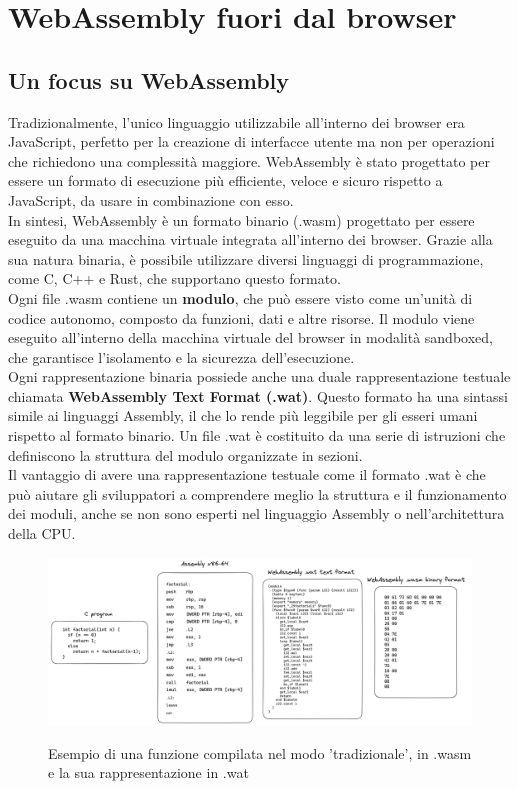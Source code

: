 \chapter{WebAssembly fuori dal browser}

\section{Un focus su WebAssembly}
\label{sec:webassembly}
Tradizionalmente, l'unico linguaggio utilizzabile all'interno dei browser era JavaScript, perfetto per la creazione di
interfacce utente ma non per operazioni che richiedono una complessità maggiore. WebAssembly è stato progettato per
essere un formato di esecuzione più efficiente, veloce e sicuro rispetto a JavaScript, da usare in combinazione con
esso\cite{webassembly-concepts}. \\
In sintesi, WebAssembly è un formato binario (.wasm) progettato per essere eseguito da una macchina virtuale integrata
all'interno dei browser. Grazie alla sua natura binaria, è possibile utilizzare diversi linguaggi di programmazione,
come C, C++ e Rust, che supportano questo formato. \\
Ogni file .wasm contiene un \textbf{modulo}, che può essere visto come un'unità di codice autonomo, composto da
funzioni, dati e altre risorse. Il modulo viene eseguito all'interno della macchina virtuale del browser in modalità
sandboxed, che garantisce l'isolamento e la sicurezza dell'esecuzione. \\
Ogni rappresentazione binaria possiede anche una duale rappresentazione testuale chiamata \textbf{WebAssembly Text
Format (.wat)}. Questo formato ha una sintassi simile ai linguaggi Assembly, il che lo rende più leggibile per gli
esseri umani rispetto al formato binario. Un file .wat è costituito da una serie di istruzioni che definiscono la
struttura del modulo organizzate in sezioni. \\
Il vantaggio di avere una rappresentazione testuale come il formato .wat è che può aiutare gli sviluppatori a
comprendere meglio la struttura e il funzionamento dei moduli, anche se non sono esperti nel linguaggio Assembly o
nell'architettura della CPU.

\begin{figure}[h]
    \centering
    \captionsetup{justification=centering}
    \includegraphics[width=15cm]{./chapters/1.introduction/images/3.source_code_wat_wasm.png}
    \label{source_code_wat_wasm}
    \caption{Esempio di una funzione compilata nel modo 'tradizionale', in .wasm e la sua rappresentazione in .wat}
\end{figure}

